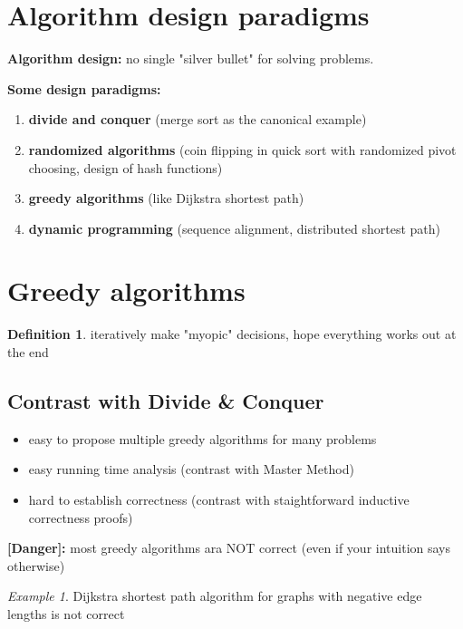 \documentclass[a4paper,12pt]{article}
\theoremstyle{plain}
\theoremstyle{definition}
\newtheorem*{definition}{Definition}
\theoremstyle{remark}
\newtheorem*{example}{Example}
\begin{document}
\tableofcontents





\newpage
\section{Algorithm design paradigms}
\textbf{Algorithm design:} no single "silver bullet" for solving problems.

\textbf{Some design paradigms:}
\begin{enumerate}
\item \textbf{divide and conquer} (merge sort as the canonical example)
\item \textbf{randomized algorithms} (coin flipping in quick sort with randomized pivot choosing, design of hash functions)
\item \textbf{greedy algorithms} (like Dijkstra shortest path)
\item \textbf{dynamic programming} (sequence alignment, distributed shortest path)
\end{enumerate}





\newpage
\section{Greedy algorithms}
\begin{definition}iteratively make "myopic" decisions, hope everything works out at the end\end{definition}



\subsection{Contrast with Divide \& Conquer}
\begin{itemize}
\item easy to propose multiple greedy algorithms for many problems
\item easy running time analysis (contrast with Master Method)
\item hard to establish correctness (contrast with staightforward inductive correctness proofs)
\end{itemize}

\textbf{[Danger]:} most greedy algorithms ara NOT correct (even if your intuition says otherwise)

\begin{example}Dijkstra shortest path algorithm for graphs with negative edge lengths is not correct\end{example}
\end{document}
